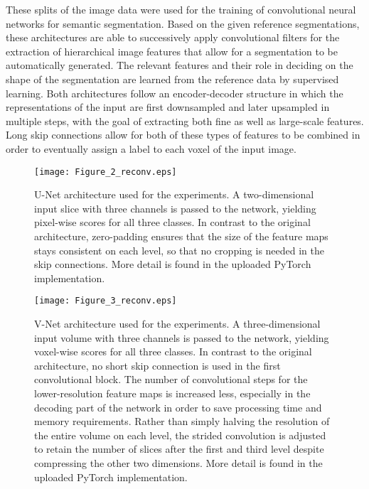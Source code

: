 \documentclass[10pt,letterpaper]{article}
\begin{document}
	These splits of the image data were used for the training of convolutional neural networks for semantic segmentation. Based on the given reference segmentations, these architectures are able to successively apply convolutional filters for the extraction of hierarchical image features that allow for a segmentation to be automatically generated. The relevant features and their role in deciding on the shape of the segmentation are learned from the reference data by supervised learning.
	Both architectures follow an encoder-decoder structure in which the representations of the input are first downsampled and later upsampled in multiple steps, with the goal of extracting both fine as well as large-scale features. Long skip connections allow for both of these types of features to be combined in order to eventually assign a label to each voxel of the input image.
	
		\begin{figure}[t] %
			
			
			\texttt{[image: Figure\_2\_reconv.eps]}
			
			\caption{U-Net architecture used for the experiments. A two-dimensional input slice with three channels is passed to the network, yielding pixel-wise scores for all three classes. In contrast to the original architecture, zero-padding ensures that the size of the feature maps stays consistent on each level, so that no cropping is needed in the skip connections. More detail is found in the uploaded PyTorch implementation.}
			
			\label{fig2} %
			
		\end{figure}
		
			\begin{figure}[t] %
				
				
				\texttt{[image: Figure\_3\_reconv.eps]}
				
				\caption{V-Net architecture used for the experiments. A three-dimensional input volume with three channels is passed to the network, yielding voxel-wise scores for all three classes. In contrast to the original architecture, no short skip connection is used in the first convolutional block. The number of convolutional steps for the lower-resolution feature maps is increased less, especially in the decoding part of the network in order to save processing time and memory requirements. Rather than simply halving the resolution of the entire volume on each level, the strided convolution is adjusted to retain the number of slices after the first and third level despite compressing the other two dimensions. More detail is found in the uploaded PyTorch implementation.}
				
				\label{fig3} %
				
			\end{figure}
\end{document}
